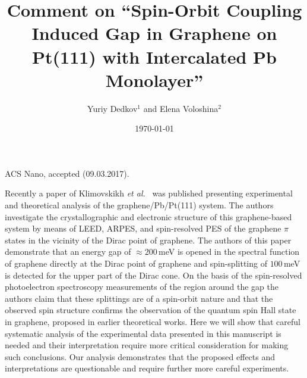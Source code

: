 \documentclass[twocolumn,preprintnumbers,amsmath,amssymb,prl]{revtex4}
\begin{document}
ACS Nano, accepted (09.03.2017).\\

\title{Comment on ``Spin-Orbit Coupling Induced Gap in Graphene on Pt(111) with Intercalated Pb Monolayer''}

\author{Yuriy Dedkov$^{1}$ and Elena Voloshina$^{2}$}


\date{\today}


\maketitle

Recently a paper of Klimovskikh \textit{et al.}~\cite{Klimovskikh:2017jh} was published presenting experimental and theoretical analysis of the graphene/Pb/Pt(111) system. The authors investigate the crystallographic and electronic structure of this graphene-based system by means of LEED, ARPES, and spin-resolved PES of the graphene $\pi$ states in the vicinity of the Dirac point of graphene. The authors of this paper demonstrate that an energy gap of $\approx200$\,meV is opened in the spectral function of graphene directly at the Dirac point of graphene and spin-splitting of $100$\,meV is detected for the upper part of the Dirac cone. On the basis of the spin-resolved photoelectron spectroscopy measurements of the region around the gap the authors claim that these splittings are of a spin-orbit nature and that the observed spin structure confirms the observation of the quantum spin Hall state in graphene, proposed in earlier theoretical works. Here we will show that careful systematic analysis of the experimental data presented in this manuscript is needed and their interpretation require more critical consideration for making such conclusions. Our analysis demonstrates that the proposed effects and interpretations are questionable and require further more careful experiments.
\end{document}

